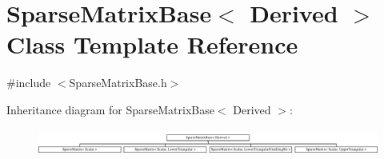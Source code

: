 \hypertarget{class_sparse_matrix_base}{\section{Sparse\-Matrix\-Base$<$ Derived $>$ Class Template Reference}
\label{class_sparse_matrix_base}
}


{\ttfamily \#include $<$Sparse\-Matrix\-Base.\-h$>$}

Inheritance diagram for Sparse\-Matrix\-Base$<$ Derived $>$\-:\begin{figure}[H]
\begin{center}
\leavevmode
\includegraphics[height=0.869565cm]{class_sparse_matrix_base}
\end{center}
\end{figure}
